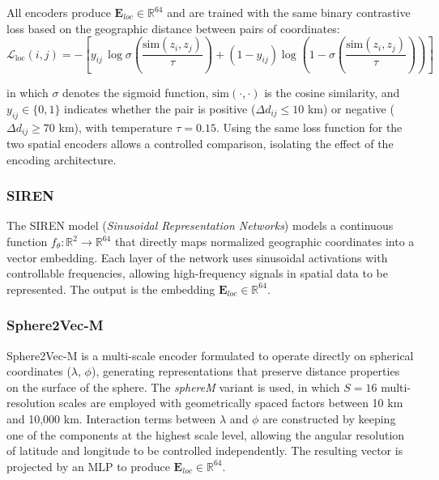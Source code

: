 All encoders produce $\mathbf{E}_{loc} \in \mathbb{R}^{64}$ and are
trained with the same binary contrastive loss based on the geographic distance between pairs of coordinates:
\begin{equation}
\mathcal{L}_{\text{loc}}(i,j)
=
- \left[
y_{ij}\,\log \sigma\!\left(\frac{\text{sim}(z_i,z_j)}{\tau}\right)
+
(1-y_{ij})
\log \left(1 - \sigma\!\left(\frac{\text{sim}(z_i,z_j)}{\tau}\right)\right)
\right]
\end{equation}

in which $\sigma$ denotes the sigmoid function, $\text{sim}(\cdot,\cdot)$ is the cosine similarity, and $y_{ij} \in \{0,1\}$ indicates whether the pair is positive ($\Delta d_{ij} \leq 10$ km) or negative ($\Delta d_{ij} \geq 70$ km), with temperature $\tau = 0.15$. Using the same loss function for the two spatial encoders allows a controlled comparison, isolating the effect of the encoding architecture.

\subsubsection{SIREN}

The SIREN model (\textit{Sinusoidal Representation Networks}) \cite{russwurm2024geographiclocationencodingspherical} models a continuous function $f_\theta : \mathbb{R}^2 \rightarrow \mathbb{R}^{64}$ that directly maps normalized geographic coordinates into a vector embedding. Each layer of the network uses sinusoidal activations with controllable frequencies, allowing high-frequency signals in spatial data to be represented. The output is the embedding $\mathbf{E}_{loc} \in \mathbb{R}^{64}$.

\subsubsection{Sphere2Vec-M}

Sphere2Vec-M \cite{mai2023sphere2vecgeneralpurposelocationrepresentation} is a multi-scale encoder formulated to operate directly on spherical coordinates ($\lambda$, $\phi$), generating representations that preserve distance properties on the surface of the sphere. The \textit{sphereM} variant is used, in which $S=16$ multi-resolution scales are employed with geometrically spaced factors between 10 km and 10,000 km. Interaction terms between $\lambda$ and $\phi$ are constructed by keeping one of the components at the highest scale level, allowing the angular resolution of latitude and longitude to be controlled independently. The resulting vector is projected by an MLP to produce $\mathbf{E}_{loc} \in \mathbb{R}^{64}$.

